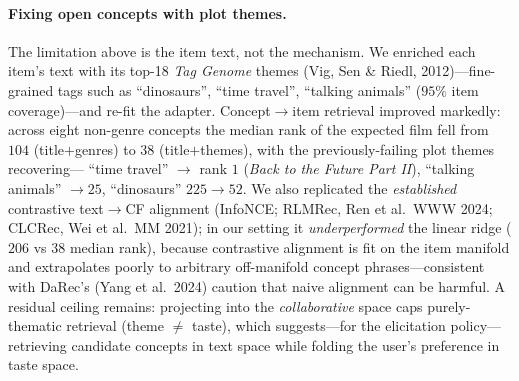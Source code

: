 \documentclass[11pt]{article}
\begin{document}
\paragraph{Fixing open concepts with plot themes.} The limitation above is the item text, not the mechanism. We
enriched each item's text with its top-18 \emph{Tag Genome} themes (Vig, Sen \& Riedl, 2012)---fine-grained tags
such as ``dinosaurs'', ``time travel'', ``talking animals'' ($95\%$ item coverage)---and re-fit the adapter.
Concept$\to$item retrieval improved markedly: across eight non-genre concepts the median rank of the expected film
fell from $104$ (title$+$genres) to $38$ (title$+$themes), with the previously-failing plot themes recovering---
``time travel'' $\to$ rank $1$ (\emph{Back to the Future Part II}), ``talking animals'' $\to 25$, ``dinosaurs''
$225\to52$. We also replicated the \emph{established} contrastive text$\to$CF alignment (InfoNCE; RLMRec, Ren et
al.\ WWW 2024; CLCRec, Wei et al.\ MM 2021); in our setting it \emph{underperformed} the linear ridge ($206$ vs
$38$ median rank), because contrastive alignment is fit on the item manifold and extrapolates poorly to arbitrary
off-manifold concept phrases---consistent with DaRec's (Yang et al.\ 2024) caution that naive alignment can be
harmful. A residual ceiling remains: projecting into the \emph{collaborative} space caps purely-thematic retrieval
(theme $\neq$ taste), which suggests---for the elicitation policy---retrieving candidate concepts in text space
while folding the user's preference in taste space.
\end{document}
